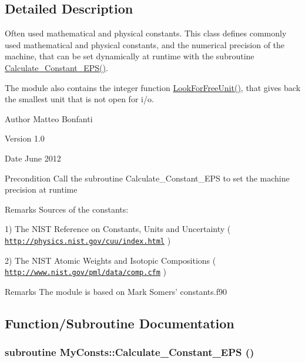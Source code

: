 \subsection{Detailed Description}
Often used mathematical and physical constants. This class defines commonly used mathematical and physical constants, and the numerical precision of the machine, that can be set dynamically at runtime with the subroutine \hyperlink{namespace_my_consts_a30010b124d6326386412e65f9673b934}{Calculate\_\-Constant\_\-EPS()}. \par
 The module also contains the integer function \hyperlink{namespace_my_consts_a093b1ea96b1aa71b483171f830362952}{LookForFreeUnit()}, that gives back the smallest unit that is not open for i/o.\begin{DoxyAuthor}{Author}
Matteo Bonfanti 
\end{DoxyAuthor}
\begin{DoxyVersion}{Version}
1.0 
\end{DoxyVersion}
\begin{DoxyDate}{Date}
June 2012
\end{DoxyDate}
\begin{DoxyPrecond}{Precondition}
Call the subroutine Calculate\_\-Constant\_\-EPS to set the machine precision at runtime
\end{DoxyPrecond}
\begin{DoxyRemark}{Remarks}
Sources of the constants: \par
 1) The NIST Reference on Constants, Units and Uncertainty ( \href{http://physics.nist.gov/cuu/index.html}{\tt http://physics.nist.gov/cuu/index.html} ) \par
 2) The NIST Atomic Weights and Isotopic Compositions ( \href{http://www.nist.gov/pml/data/comp.cfm}{\tt http://www.nist.gov/pml/data/comp.cfm} ) 
\end{DoxyRemark}
\begin{DoxyParagraph}{}

\end{DoxyParagraph}
\begin{DoxyRemark}{Remarks}
The module is based on Mark Somers' constants.f90 
\end{DoxyRemark}


\subsection{Function/Subroutine Documentation}
\hypertarget{namespace_my_consts_a30010b124d6326386412e65f9673b934}{
\subsubsection[{Calculate\_\-Constant\_\-EPS}]{\setlength{\rightskip}{0pt plus 5cm}subroutine MyConsts::Calculate\_\-Constant\_\-EPS ()}}
\label{namespace_my_consts_a30010b124d6326386412e65f9673b934}



